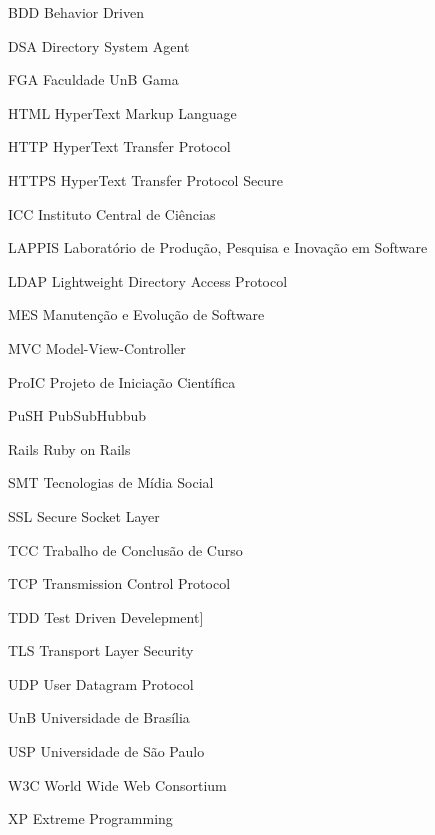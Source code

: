 \begin{siglas}
  \item[BDD] Behavior Driven 
  \item[DSA] Directory System Agent
  \item[FGA] Faculdade UnB Gama
  \item[HTML] HyperText Markup Language
  \item[HTTP] HyperText Transfer Protocol
  \item[HTTPS] HyperText Transfer Protocol Secure
  \item[ICC] Instituto Central de Ciências
  \item[LAPPIS] Laboratório de Produção, Pesquisa e Inovação em Software
  \item[LDAP] Lightweight Directory Access Protocol
  \item[MES] Manutenção e Evolução de Software
  \item[MVC] Model-View-Controller
  \item[ProIC] Projeto de Iniciação Científica
  \item[PuSH] PubSubHubbub
  \item[Rails] Ruby on Rails
  \item[SMT] Tecnologias de Mídia Social
  \item[SSL] Secure Socket Layer
  \item[TCC] Trabalho de Conclusão de Curso
  \item[TCP] Transmission Control Protocol
  \item[TDD] Test Driven Develepment]
  \item[TLS] Transport Layer Security
  \item[UDP] User Datagram Protocol
  \item[UnB] Universidade de Brasília
  \item[USP] Universidade de São Paulo
  \item[W3C] World Wide Web Consortium
  \item[XP] Extreme Programming
\end{siglas}
